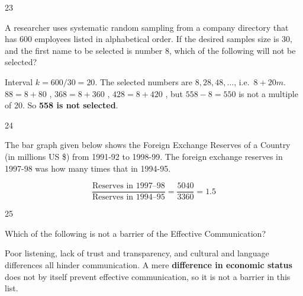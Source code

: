 \begin{question}{23}
{A researcher uses systematic random sampling from a company directory that has 600 employees listed in alphabetical order. If the desired samples size is 30, and the first name to be selected is number 8, which of the following will not be selected?\par}
\begin{explain}
Interval $k=600/30=20$. The selected numbers are $8, 28, 48, \ldots$, i.e.\ $8+20m$.
$88=8+80$ \checkmark, $368=8+360$ \checkmark, $428=8+420$ \checkmark, but $558-8=550$ is not a multiple of 20. So \textbf{558 is not selected}.
\end{explain}
\end{question}

\begin{question}{24}
{The bar graph given below shows the Foreign Exchange Reserves of a Country (in millions US \$) from 1991-92 to 1998-99. The foreign exchange reserves in 1997-98 was how many times that in 1994-95.\par}
\begin{explain}
\[\frac{\text{Reserves in 1997--98}}{\text{Reserves in 1994--95}}=\frac{5040}{3360}=\mathbf{1.5}\]
\end{explain}
\end{question}

\begin{question}{25}
{Which of the following is not a barrier of the Effective Communication?\par}
\begin{explain}
Poor listening, lack of trust and transparency, and cultural and language differences all hinder communication. A mere \textbf{difference in economic status} does not by itself prevent effective communication, so it is not a barrier in this list.
\end{explain}
\end{question}


